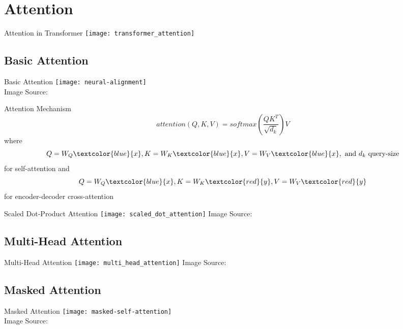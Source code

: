 \section{Attention}

\begin{frame}[c]{Attention in Transformer}
    \texttt{[image: transformer\_attention]}
\end{frame}


\subsection{Basic Attention}

\begin{frame}[c]{Basic Attention}
    \texttt{[image: neural-alignment]} \\
    Image Source: \cite{bahdanau_neural_2016}
\end{frame}

\begin{frame}[c]{Attention Mechanism}
    \large
    $$attention(Q, K, V) = softmax(\frac{QK^T}{\sqrt{d_k}})V$$
    \pause
    where
    $$Q = W_Q\textcolor{blue}{x}, K = W_K\textcolor{blue}{x}, V = W_V\textcolor{blue}{x}, \text{ and } d_k \text{ query-size}$$
    for self-attention \pause and
    $$Q = W_Q\textcolor{blue}{x}, K = W_K\textcolor{red}{y}, V = W_V\textcolor{red}{y}$$
    for encoder-decoder cross-attention
\end{frame}


\begin{frame}[c]{Scaled Dot-Product Attention}
    \texttt{[image: scaled\_dot\_attention]}
    Image Source: \cite{vaswani_attention_2017}
\end{frame}


\subsection{Multi-Head Attention}
\begin{frame}[c]{Multi-Head Attention}
    \texttt{[image: multi\_head\_attention]}
    Image Source: \cite{vaswani_attention_2017}
\end{frame}

\subsection{Masked Attention}
\begin{frame}[c]{Masked Attention}
    \texttt{[image: masked-self-attention]} \\
    Image Source: \cite{alammar_illustrated_2019}
\end{frame}

